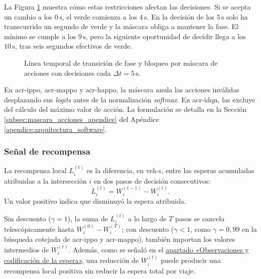 La Figura \ref{fig:cambio_mascara} muestra cómo estas restricciones afectan las decisiones. Si se acepta un cambio a los $0\,\text{s}$, el verde comienza a los $4\,\text{s}$. En la decisión de los $5\,\text{s}$ solo ha transcurrido un segundo de verde y la máscara obliga a mantener la fase. El mínimo se cumple a los $9\,\text{s}$, pero la siguiente oportunidad de decidir llega a los $10\,\text{s}$, tras seis segundos efectivos de verde.

\begin{figure}[H]
\centering

\caption{Línea temporal de transición de fase y bloqueo por máscara de acciones con decisiones cada $\Delta t = 5\,\text{s}$.}
\label{fig:cambio_mascara}
\end{figure}

En \acrshort{acr-ippo}, \acrshort{acr-mappo} y \acrshort{acr-happo}, la máscara anula las acciones inválidas desplazando sus \textit{logits} antes de la normalización \textit{softmax}. En \acrshort{acr-idqn}, las excluye del cálculo del máximo valor de acción. La formulación se detalla en la Sección \ref{subsec:mascara_acciones_apendice} del Apéndice \ref{apendice:arquitectura_software}.

\subsubsection{Señal de recompensa}
\label{subsec:recompensa_coordinacion}

La recompensa local $L_i^{(t)}$ es la diferencia, en veh$\cdot$s, entre las esperas acumuladas atribuidas a la intersección $i$ en dos pasos de decisión consecutivos:
\begin{equation}
L_i^{(t)} = W_i^{(t-1)} - W_i^{(t)}.
\label{eq:recompensa_local}
\end{equation}
Un valor positivo indica que disminuyó la espera atribuida.

Sin descuento ($\gamma=1$), la suma de $L_i^{(t)}$ a lo largo de $T$ pasos se cancela telescópicamente hasta $W_i^{(0)} - W_i^{(T)}$; con descuento ($\gamma<1$, como $\gamma=0{,}99$ en la búsqueda cotejada de \acrshort{acr-ippo} y \acrshort{acr-mappo}), también importan los valores intermedios de $W_i^{(t)}$. Además, como se señaló en el \hyperref[subsec:observaciones_encoder]{apartado «Observaciones y codificación de la espera»}, una reducción de $W_i^{(t)}$ puede producir una recompensa local positiva sin reducir la espera total por viaje.

